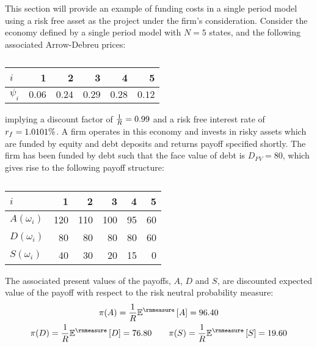 \documentclass[main.tex]{subfiles}
\begin{document}
    This section will provide an example of funding costs in a single period model
    using a risk free asset as the project under the firm's consideration.
    Consider the economy defined by a single period model with $N=5$ states, 
    and the following associated Arrow-Debreu prices:
        \begin{table}[H]
            \centering
            \begin{tabular}{l|rrrrr}
                $i$ & 1 & 2 & 3 & 4 & 5 \\
                \hline
                $\psi_{i}$ & $0.06$ & $0.24$ & $0.29$ & $0.28$ & $0.12$ \\
            \end{tabular}
            \caption{}
            \label{tbl:example-firm-structure}
        \end{table}
    implying a discount factor of $\frac{1}{R} = 0.99$ and a risk free interest rate of $r_{f} = 1.0101\%$.
    A firm operates in this economy and invests in risky assets 
    which are funded by equity and debt deposits and returns payoff specified shortly.
    The firm has been funded by debt such that the face value of debt is $D_{FV} = 80$, 
    which gives rise to the following payoff structure:
    \begin{table}[H]
        \centering
        \begin{tabular}{l|rrrrr}
            $i$ & 1 & 2 & 3 & 4 & 5 \\
            \hline
            $A(\omega_{i})$ & 120 & 110 & 100 & 95 & 60 \\
            $D(\omega_{i})$ & 80 & 80 & 80 & 80 & 60 \\
            $S(\omega_{i})$ & 40 & 30 & 20 & 15 & 0
        \end{tabular}
        \caption{}
    \end{table}
    The associated present values of the payoffs, $A$, $D$ and $S$, 
    are discounted expected value of the payoff with respect to the risk neutral probability measure:
        \begin{gather}
            \pi(A) = \discountfactor \mathbb{E}^{\rnmeasure}\left[A\right] = 96.40 \\
            \pi(D) = \discountfactor \mathbb{E}^{\rnmeasure}\left[D\right] = 76.80
            \qquad \pi(S) = \discountfactor \mathbb{E}^{\rnmeasure}\left[S\right] = 19.60
        \end{gather}
\end{document}
